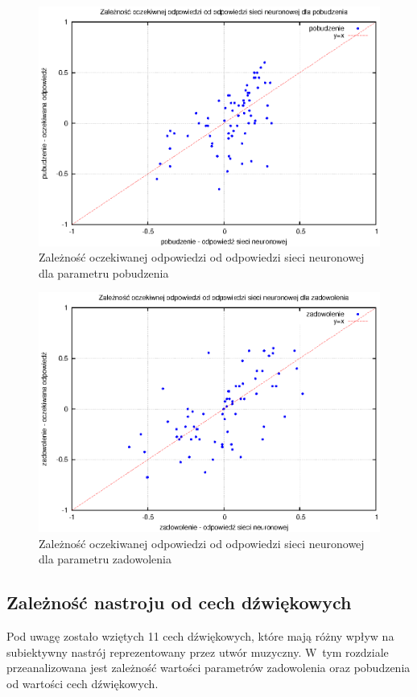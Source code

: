 \begin{figure}[ht!]
\centering
\includegraphics[scale=\imageSize]{res/arousal.eps}
\caption{Zależność oczekiwanej odpowiedzi od odpowiedzi sieci neuronowej dla parametru pobudzenia\label{arousal}}
\end{figure}

\begin{figure}[ht!]
\centering
\includegraphics[scale=\imageSize]{res/valence.eps}
\caption{Zależność oczekiwanej odpowiedzi od odpowiedzi sieci neuronowej dla parametru zadowolenia\label{valence}}
\end{figure}


\subsection{Zależność nastroju od cech dźwiękowych}\label{rozdzial_zaleznosc}
Pod uwagę zostało wziętych 11 cech dźwiękowych, które mają różny wpływ na subiektywny nastrój reprezentowany przez utwór muzyczny. W~tym rozdziale przeanalizowana jest zależność wartości parametrów zadowolenia oraz pobudzenia od wartości cech dźwiękowych. 



